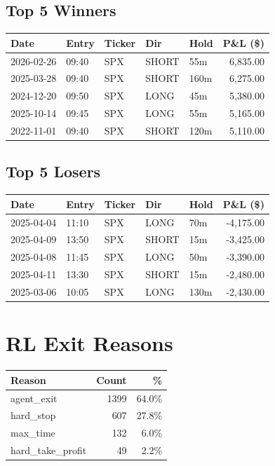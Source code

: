 \documentclass[11pt,a4paper,twoside]{article}
\begin{document}
\subsection*{Top 5 Winners}
\noindent\begin{center}
\begin{tabular}{>{\color{txtmain}}l llll r}
\toprule
\rowcolor{cardbg}
\textbf{Date} & \textbf{Entry} & \textbf{Ticker} & \textbf{Dir} & \textbf{Hold} & \textbf{P\&L (\$)} \\
\midrule
2026-02-26 & 09:40 & SPX & SHORT & 55m & \textcolor{wingreen}{6,835.00} \\
2025-03-28 & 09:40 & SPX & SHORT & 160m & \textcolor{wingreen}{6,275.00} \\
2024-12-20 & 09:50 & SPX & LONG & 45m & \textcolor{wingreen}{5,380.00} \\
2025-10-14 & 09:45 & SPX & LONG & 55m & \textcolor{wingreen}{5,165.00} \\
2022-11-01 & 09:40 & SPX & SHORT & 120m & \textcolor{wingreen}{5,110.00} \\
\bottomrule
\end{tabular}
\end{center}
\subsection*{Top 5 Losers}
\noindent\begin{center}
\begin{tabular}{>{\color{txtmain}}l llll r}
\toprule
\rowcolor{cardbg}
\textbf{Date} & \textbf{Entry} & \textbf{Ticker} & \textbf{Dir} & \textbf{Hold} & \textbf{P\&L (\$)} \\
\midrule
2025-04-04 & 11:10 & SPX & LONG & 70m & \textcolor{lossred}{-4,175.00} \\
2025-04-09 & 13:50 & SPX & SHORT & 15m & \textcolor{lossred}{-3,425.00} \\
2025-04-08 & 11:45 & SPX & LONG & 50m & \textcolor{lossred}{-3,390.00} \\
2025-04-11 & 13:30 & SPX & SHORT & 15m & \textcolor{lossred}{-2,480.00} \\
2025-03-06 & 10:05 & SPX & LONG & 130m & \textcolor{lossred}{-2,430.00} \\
\bottomrule
\end{tabular}
\end{center}
\clearpage
\section*{RL Exit Reasons}
\noindent\begin{center}
\begin{tabular}{>{\color{txtmain}}l rr}
\toprule
\rowcolor{cardbg}
\textbf{Reason} & \textbf{Count} & \textbf{\%} \\
\midrule
agent\_exit & 1399 & 64.0\% \\
hard\_stop & 607 & 27.8\% \\
max\_time & 132 & 6.0\% \\
hard\_take\_profit & 49 & 2.2\% \\
\bottomrule
\end{tabular}
\end{center}
\end{document}
